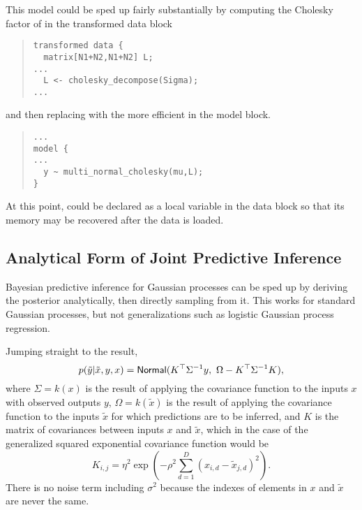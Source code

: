 This model could be sped up fairly substantially by computing the
Cholesky factor of  in the transformed data block
\begin{quote}
\begin{Verbatim}[fontsize=\small]
transformed data {
  matrix[N1+N2,N1+N2] L;
...
  L <- cholesky_decompose(Sigma);
...
\end{Verbatim}
\end{quote}
%
and then replacing  with the more efficient
 in the model block.  
%
\begin{quote}
\begin{Verbatim}[fontsize=\small]
...
model {
...
  y ~ multi_normal_cholesky(mu,L);
}
\end{Verbatim}
\end{quote}
%  
At this point,  could be declared as a local
variable in the data block so that its memory may be recovered after
the data is loaded.

\subsection{Analytical Form of Joint Predictive Inference}

Bayesian predictive inference for Gaussian processes can be sped up by
deriving the posterior analytically, then directly sampling from it.
This works for standard Gaussian processes, but not
generalizations such as logistic Gaussian process regression.

Jumping straight to the result,
\[
p(\tilde{y}|\tilde{x},y,x)
= 
\mbox{\sf Normal}(K^{\top}\Sigma^{-1}y,\
                \Omega - K^{\top}\Sigma^{-1}K),
\]
where $\Sigma = k(x)$ is the result of applying the covariance
function to the inputs $x$ with observed outputs $y$, $\Omega =
k(\tilde{x})$ is the result of applying the covariance function to the
inputs $\tilde{x}$ for which predictions are to be inferred, and $K$
is the matrix of covariances between inputs $x$ and $\tilde{x}$, which
in the case of the generalized squared exponential covariance function
would be
\[
K_{i,j} = \eta^2 \exp(-\rho^2 \sum_{d=1}^D (x_{i,d} -
\tilde{x}_{j,d})^2).
\]
There is no noise term including $\sigma^2$ because the indexes of
elements in $x$ and $\tilde{x}$ are never the same.

